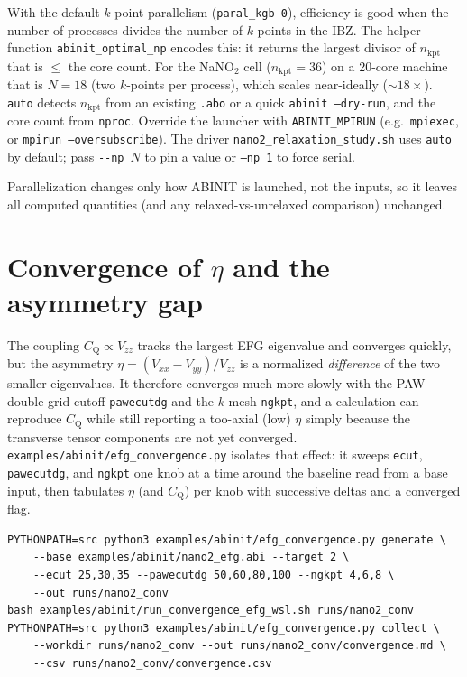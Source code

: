 \documentclass[11pt,oneside]{report}
\newcommand{\code}[1]{{\small\nolinkurl{#1}}}
\newcommand{\cmd}[1]{\texttt{\small #1}}
\newcommand{\Cq}{C_{\mathrm{Q}}}
\newcommand{\Vzz}{V_{zz}}
\begin{document}
With the default $k$-point parallelism (\cmd{paral\_kgb 0}), efficiency is good
when the number of processes divides the number of $k$-points in the IBZ. The
helper function \code{abinit\_optimal\_np} encodes this: it returns the largest
divisor of $n_{\mathrm{kpt}}$ that is $\le$ the core count. For the NaNO$_2$ cell
($n_{\mathrm{kpt}}=36$) on a 20-core machine that is $N=18$ (two $k$-points per
process), which scales near-ideally ($\sim 18\times$). \code{auto} detects
$n_{\mathrm{kpt}}$ from an existing \code{.abo} or a quick \cmd{abinit --dry-run},
and the core count from \code{nproc}. Override the launcher with
\code{ABINIT\_MPIRUN} (e.g.\ \code{mpiexec}, or \cmd{mpirun --oversubscribe}).
The driver \code{nano2\_relaxation\_study.sh} uses \code{auto} by default; pass
\code{--np}~$N$ to pin a value or \cmd{--np 1} to force serial.

Parallelization changes only how ABINIT is launched, not the inputs, so it leaves
all computed quantities (and any relaxed-vs-unrelaxed comparison) unchanged.

\section{Convergence of \texorpdfstring{$\eta$}{eta} and the asymmetry gap}
\label{sec:convergence}

The coupling $\Cq \propto \Vzz$ tracks the largest EFG eigenvalue and converges
quickly, but the asymmetry $\eta = (V_{xx}-V_{yy})/\Vzz$ is a normalized
\emph{difference} of the two smaller eigenvalues. It therefore converges much more
slowly with the PAW double-grid cutoff \code{pawecutdg} and the $k$-mesh
\code{ngkpt}, and a calculation can reproduce $\Cq$ while still reporting a
too-axial (low) $\eta$ simply because the transverse tensor components are not yet
converged. \code{examples/abinit/efg\_convergence.py} isolates that effect: it
sweeps \code{ecut}, \code{pawecutdg}, and \code{ngkpt} one knob at a time around
the baseline read from a base input, then tabulates $\eta$ (and $\Cq$) per knob
with successive deltas and a converged flag.

\begin{lstlisting}
PYTHONPATH=src python3 examples/abinit/efg_convergence.py generate \
    --base examples/abinit/nano2_efg.abi --target 2 \
    --ecut 25,30,35 --pawecutdg 50,60,80,100 --ngkpt 4,6,8 \
    --out runs/nano2_conv
bash examples/abinit/run_convergence_efg_wsl.sh runs/nano2_conv
PYTHONPATH=src python3 examples/abinit/efg_convergence.py collect \
    --workdir runs/nano2_conv --out runs/nano2_conv/convergence.md \
    --csv runs/nano2_conv/convergence.csv
\end{lstlisting}
\end{document}

